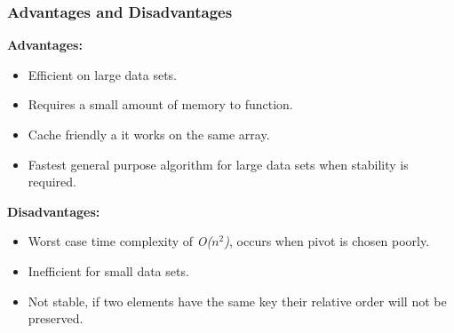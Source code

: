 \subsubsection*{Advantages and Disadvantages}

\textbf{Advantages:}

\begin{itemize}
  \item Efficient on large data sets.
  \item Requires a small amount of memory to function.
  \item Cache friendly a it works on the same array.
  \item Fastest general purpose algorithm for large data sets when stability is required.
\end{itemize}

\textbf{Disadvantages:}

\begin{itemize}
  \item Worst case time complexity of \textit{O($n^2$)}, occurs when pivot is chosen poorly.
  \item Inefficient for small data sets.
  \item Not stable, if two elements have the same key their relative order will not be preserved.
\end{itemize}
